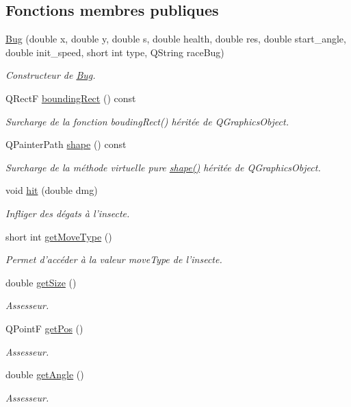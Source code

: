 \subsection*{Fonctions membres publiques}
\begin{DoxyCompactItemize}
\item 
\hyperlink{classBug_a51f8bff5f42fcdf9e0503ddb5ef74fe5}{Bug} (double x, double y, double s, double health, double res, double start\_\-angle, double init\_\-speed, short int type, QString raceBug)
\begin{DoxyCompactList}\small\item\em Constructeur de \hyperlink{classBug}{Bug}. \end{DoxyCompactList}\item 
QRectF \hyperlink{classBug_a9b39c25361faad07b1bf2dd927d09dab}{boundingRect} () const 
\begin{DoxyCompactList}\small\item\em Surcharge de la fonction boudingRect() héritée de QGraphicsObject. \end{DoxyCompactList}\item 
QPainterPath \hyperlink{classBug_a587a36d3145c2b4dba6c689af22c65ac}{shape} () const 
\begin{DoxyCompactList}\small\item\em Surcharge de la méthode virtuelle pure \hyperlink{classBug_a587a36d3145c2b4dba6c689af22c65ac}{shape()} héritée de QGraphicsObject. \end{DoxyCompactList}\item 
void \hyperlink{classBug_a63402c05b5ba3fb034e41f1ced0e4b9f}{hit} (double dmg)
\begin{DoxyCompactList}\small\item\em Infliger des dégats à l'insecte. \end{DoxyCompactList}\item 
short int \hyperlink{classBug_aced471cedcfa855baddf4c827003e755}{getMoveType} ()
\begin{DoxyCompactList}\small\item\em Permet d'accéder à la valeur moveType de l'insecte. \end{DoxyCompactList}\item 
double \hyperlink{classBug_ae29490347059f21518ff7162d0fbe9e5}{getSize} ()
\begin{DoxyCompactList}\small\item\em Assesseur. \end{DoxyCompactList}\item 
QPointF \hyperlink{classBug_a1c6d7743b87e9c4a85a58ea510c18526}{getPos} ()
\begin{DoxyCompactList}\small\item\em Assesseur. \end{DoxyCompactList}\item 
double \hyperlink{classBug_abd2246d752d1088b35e01d57d176ce5f}{getAngle} ()
\begin{DoxyCompactList}\small\item\em Assesseur. \end{DoxyCompactList}\end{DoxyCompactItemize}
